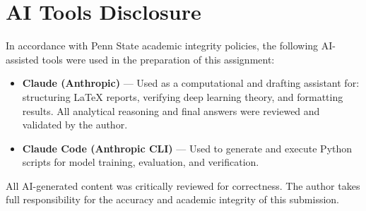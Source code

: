 \documentclass[conference]{IEEEtran}
\begin{document}
\newpage
\section*{AI Tools Disclosure}
In accordance with Penn State academic integrity policies, the following AI-assisted tools were used in the preparation of this assignment:

\begin{itemize}
\item \textbf{Claude (Anthropic)} --- Used as a computational and drafting assistant for: structuring \LaTeX{} reports, verifying deep learning theory, and formatting results. All analytical reasoning and final answers were reviewed and validated by the author.
\item \textbf{Claude Code (Anthropic CLI)} --- Used to generate and execute Python scripts for model training, evaluation, and verification.
\end{itemize}

\noindent All AI-generated content was critically reviewed for correctness. The author takes full responsibility for the accuracy and academic integrity of this submission.
\end{document}
